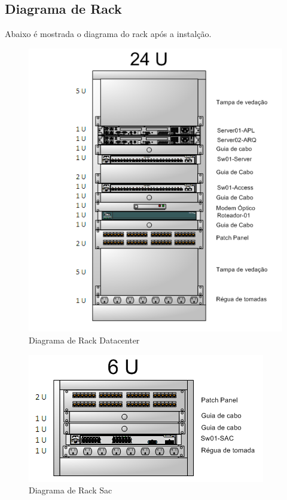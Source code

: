 \documentclass[	DIV=calc,%
							paper=a4,%
							fontsize=12pt,%
							onecolumn]{scrartcl}	 					%
\begin{document}
\subsection{Diagrama de Rack}
Abaixo é mostrada o diagrama do rack após a instalção. 
\begin{figure}
	\centering
	\includegraphics[height=\textwidth]{diagrama-rack}
	\caption{Diagrama de Rack Datacenter}
	\label{diagrama-rack}
\end{figure}

\begin{figure}
	\centering
	\includegraphics[height=\textwidth]{rack-sac}
	\caption{Diagrama de Rack Sac}
	\label{rack-sac}
\end{figure}
\end{document}
